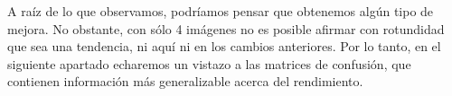 \documentclass[11pt,a4paper]{article}
\begin{document}
\begin{figure}[H]
\begin{center}
{    					}

                    \end{center}

                \end{figure}
                \begin{figure}[H]

    		        \begin{center}

                        \setlength{\fboxrule}{0pt}

    				\end{center}

    			\end{figure}

                \par
                A raíz de lo que observamos, podríamos pensar que obtenemos algún tipo de mejora. No obstante, con sólo 4 imágenes no es posible afirmar con rotundidad que sea una tendencia, ni aquí ni en los cambios anteriores. Por lo tanto, en el siguiente apartado echaremos un vistazo a las matrices de confusión, que contienen información más generalizable acerca del rendimiento.
\end{document}
